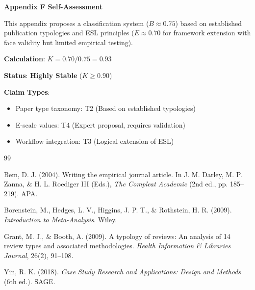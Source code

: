 \documentclass[11pt,a4paper]{article}
\begin{document}
\begin{eslbox}
\textbf{Appendix F Self-Assessment}

This appendix proposes a classification system ($B \approx 0.75$) based on established publication typologies and ESL principles ($E \approx 0.70$ for framework extension with face validity but limited empirical testing).

\textbf{Calculation}: $K = 0.70/0.75 = 0.93$

\textbf{Status}: \textcolor{eslgreen}{\textbf{Highly Stable}} ($K \geq 0.90$)

\textbf{Claim Types}:
\begin{itemize}
    \item Paper type taxonomy: T2 (Based on established typologies)
    \item E-scale values: T4 (Expert proposal, requires validation)
    \item Workflow integration: T3 (Logical extension of ESL)
\end{itemize}
\end{eslbox}


\newpage


\begin{thebibliography}{99}

Bem, D. J. (2004).
Writing the empirical journal article.
In J. M. Darley, M. P. Zanna, \& H. L. Roediger III (Eds.), \textit{The Compleat Academic} (2nd ed., pp. 185--219). APA.

Borenstein, M., Hedges, L. V., Higgins, J. P. T., \& Rothstein, H. R. (2009).
\textit{Introduction to Meta-Analysis}.
Wiley.

Grant, M. J., \& Booth, A. (2009).
A typology of reviews: An analysis of 14 review types and associated methodologies.
\textit{Health Information \& Libraries Journal}, 26(2), 91--108.

Yin, R. K. (2018).
\textit{Case Study Research and Applications: Design and Methods} (6th ed.).
SAGE.

\end{thebibliography}
\end{document}
